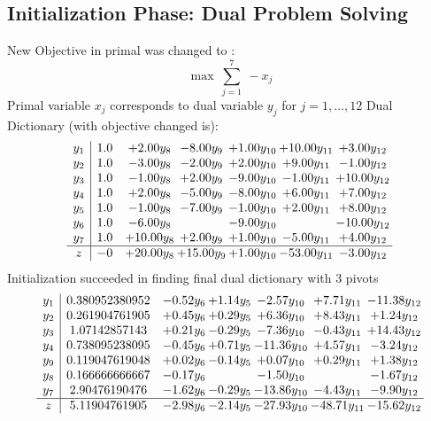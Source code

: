 \documentclass[8pt]{article}
\begin{document}
\subsection{Initialization Phase: Dual Problem Solving}
New Objective in primal was changed to : \[ \max\ \sum_{j=1}^{7}\ - x_j \] 
Primal variable $x_j$ corresponds to dual variable $y_j$ for $j = 1,\ldots,12$
Dual Dictionary (with objective changed is): 
\[\begin{array}{c| c c@{\hskip 2pt} c@{\hskip 2pt} c@{\hskip 2pt} c@{\hskip 2pt} c@{\hskip 2pt} }
 y_{1}   &  1.0 & +  2.00 y_{8} & -8.00 y_{9} & +  1.00 y_{10} & + 10.00 y_{11} & +  3.00 y_{12}\\
 y_{2}   &  1.0 & -3.00 y_{8} & -2.00 y_{9} & +  2.00 y_{10} & +  9.00 y_{11} & -1.00 y_{12}\\
 y_{3}   &  1.0 & -1.00 y_{8} & +  2.00 y_{9} & -9.00 y_{10} & -1.00 y_{11} & + 10.00 y_{12}\\
 y_{4}   &  1.0 & +  2.00 y_{8} & -5.00 y_{9} & -8.00 y_{10} & +  6.00 y_{11} & +  7.00 y_{12}\\
 y_{5}   &  1.0 & -1.00 y_{8} & -7.00 y_{9} & -1.00 y_{10} & +  2.00 y_{11} & +  8.00 y_{12}\\
 y_{6}   &  1.0 & -6.00 y_{8} &   & -9.00 y_{10} &   & -10.00 y_{12}\\
 y_{7}   &  1.0 & + 10.00 y_{8} & +  2.00 y_{9} & +  1.00 y_{10} & -5.00 y_{11} & +  4.00 y_{12}\\
\hline
z    &  -0 & + 20.00 y_{8} & + 15.00 y_{9} & +  1.00 y_{10} & -53.00 y_{11} & -3.00 y_{12}\\
\end{array}\]
Initialization succeeded in finding final dual dictionary with 3 pivots
\[\begin{array}{c| c c@{\hskip 2pt} c@{\hskip 2pt} c@{\hskip 2pt} c@{\hskip 2pt} c@{\hskip 2pt} }
 y_{1}   &  0.380952380952 & -0.52 y_{6} & +  1.14 y_{5} & -2.57 y_{10} & +  7.71 y_{11} & -11.38 y_{12}\\
 y_{2}   &  0.261904761905 & +  0.45 y_{6} & +  0.29 y_{5} & +  6.36 y_{10} & +  8.43 y_{11} & +  1.24 y_{12}\\
 y_{3}   &  1.07142857143 & +  0.21 y_{6} & -0.29 y_{5} & -7.36 y_{10} & -0.43 y_{11} & + 14.43 y_{12}\\
 y_{4}   &  0.738095238095 & -0.45 y_{6} & +  0.71 y_{5} & -11.36 y_{10} & +  4.57 y_{11} & -3.24 y_{12}\\
 y_{9}   &  0.119047619048 & +  0.02 y_{6} & -0.14 y_{5} & +  0.07 y_{10} & +  0.29 y_{11} & +  1.38 y_{12}\\
 y_{8}   &  0.166666666667 & -0.17 y_{6} &   & -1.50 y_{10} &   & -1.67 y_{12}\\
 y_{7}   &  2.90476190476 & -1.62 y_{6} & -0.29 y_{5} & -13.86 y_{10} & -4.43 y_{11} & -9.90 y_{12}\\
\hline
z    &  5.11904761905 & -2.98 y_{6} & -2.14 y_{5} & -27.93 y_{10} & -48.71 y_{11} & -15.62 y_{12}\\
\end{array}\]
\end{document}
